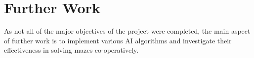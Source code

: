 
\chapter{Further Work}\label{furtherwork}
As not all of the major objectives of the project were completed, the main aspect of further work is to implement various AI algorithms and investigate their effectiveness in solving mazes co-operatively.  